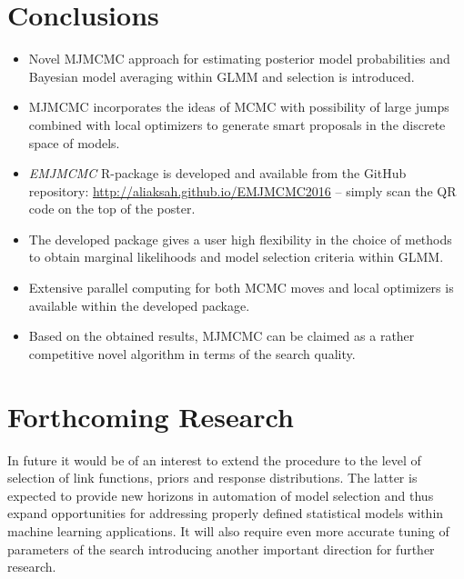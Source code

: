 \documentclass[a0,portrait]{a0poster}
\begin{document}
\begin{multicols}{2}
\color{SaddleBrown} %

\section*{Conclusions}
\begin{itemize}
\item Novel MJMCMC approach for estimating posterior model probabilities and Bayesian model averaging within GLMM and selection is introduced. 
\item   MJMCMC incorporates the ideas of MCMC with possibility of large jumps combined with local optimizers to generate smart proposals in the discrete space of models.
\item \textit{EMJMCMC} R-package is developed and available from the GitHub repository: \url{http://aliaksah.github.io/EMJMCMC2016} -- simply scan the QR code on the top of the poster.
\item  The developed package gives a user high flexibility in the choice of methods to obtain marginal likelihoods and model selection criteria within GLMM.
\item   Extensive parallel computing for both MCMC moves and local optimizers is available within the developed package.
\item Based on the obtained results, MJMCMC can be claimed as a rather competitive novel algorithm in terms of the search quality.
\end{itemize}

\color{DarkSlateGray} %


\section*{Forthcoming Research}

In future it would be of an interest to extend the procedure to the level of selection of link functions, priors and response distributions. The latter is expected to provide new horizons in automation of model selection and thus expand opportunities for addressing properly defined statistical models within machine learning applications. It will also require even more accurate tuning of parameters of the search introducing another important direction for further research.
\footnotesize
\color{black}
\let\oldbibliography\thebibliography
\renewcommand{\thebibliography}[1]{\oldbibliography{#1}
\setlength{\itemsep}{2pt}} %


\end{multicols}
\end{document}
